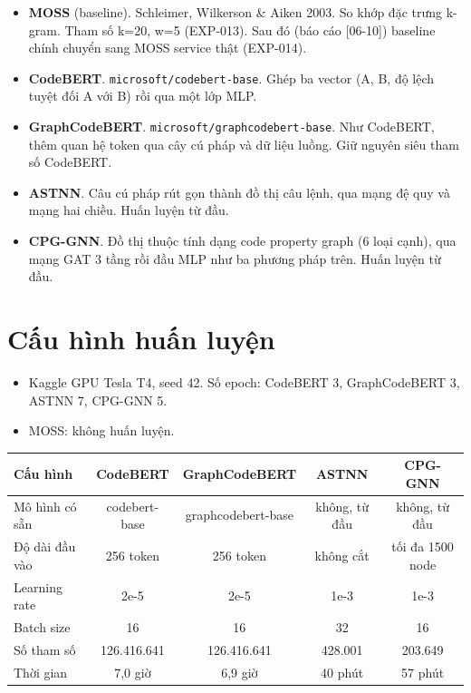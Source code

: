 \documentclass[11pt,a4paper]{article}
\begin{document}
\begin{itemize}
\item \textbf{MOSS} (baseline). Schleimer, Wilkerson \& Aiken 2003. So khớp đặc trưng
      k-gram. Tham số k=20, w=5 (EXP-013). Sau đó (báo cáo [06-10]) baseline chính
      chuyển sang MOSS service thật (EXP-014).
\item \textbf{CodeBERT}. \texttt{microsoft/\allowbreak codebert-base}. Ghép ba
      vector (A, B, độ lệch tuyệt đối A với B) rồi qua một lớp MLP.
\item \textbf{GraphCodeBERT}. \texttt{microsoft/\allowbreak graphcodebert-base}.
      Như CodeBERT, thêm quan hệ token qua cây cú pháp và dữ liệu luồng. Giữ nguyên
      siêu tham số CodeBERT.
\item \textbf{ASTNN}. Câu cú pháp rút gọn thành đồ thị câu lệnh, qua mạng đệ quy
      và mạng hai chiều. Huấn luyện từ đầu.
\item \textbf{CPG-GNN}. Đồ thị thuộc tính dạng code property graph (6 loại cạnh),
      qua mạng GAT 3 tầng rồi đầu MLP như ba phương pháp trên. Huấn luyện từ đầu.
\end{itemize}

\section{Cấu hình huấn luyện}

\begin{itemize}
\item Kaggle GPU Tesla T4, seed 42. Số epoch: CodeBERT 3, GraphCodeBERT 3,
      ASTNN 7, CPG-GNN 5.
\item MOSS: không huấn luyện.
\end{itemize}

{\small
\begin{tabular*}{\textwidth}{@{\extracolsep{\fill}}lcccc@{}}
\toprule
\textbf{Cấu hình} & \textbf{CodeBERT} & \textbf{GraphCodeBERT} & \textbf{ASTNN} &
\textbf{CPG-GNN} \\
\midrule
Mô hình có sẵn & codebert-base & graphcodebert-base & không, từ đầu & không, từ đầu \\
Độ dài đầu vào & 256 token & 256 token & không cắt & tối đa 1500 node \\
Learning rate & 2e-5 & 2e-5 & 1e-3 & 1e-3 \\
Batch size & 16 & 16 & 32 & 16 \\
Số tham số & 126.416.641 & 126.416.641 & 428.001 & 203.649 \\
Thời gian & 7,0 giờ & 6,9 giờ & 40 phút & 57 phút \\
\bottomrule
\end{tabular*}\par}
\end{document}
